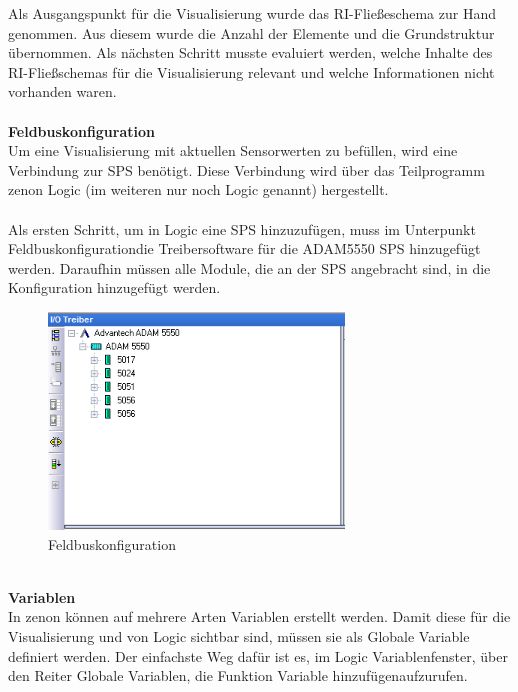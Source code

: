Als Ausgangspunkt für die Visualisierung wurde das RI-Fließeschema zur Hand genommen. Aus diesem wurde die Anzahl der Elemente und die Grundstruktur übernommen. Als nächsten Schritt musste evaluiert werden, welche Inhalte des RI-Fließschemas für die Visualisierung relevant und welche Informationen nicht vorhanden waren.\\
\\
\textbf{Feldbuskonfiguration}\\
Um eine Visualisierung mit aktuellen Sensorwerten zu befüllen, wird eine Verbindung zur SPS benötigt. Diese Verbindung wird über das Teilprogramm zenon Logic (im weiteren nur noch Logic genannt) hergestellt.\\
\\
Als ersten Schritt, um in Logic eine SPS hinzuzufügen, muss im Unterpunkt \glqq Feldbuskonfiguration\grqq\space die Treibersoftware für die ADAM5550 SPS hinzugefügt werden. Daraufhin müssen alle Module, die an der SPS angebracht sind, in die Konfiguration hinzugefügt werden.\\%
\begin{figure}[h!]
  \centering
  \includegraphics[width=0.7\textwidth]{graphics/implementation/Feldbuskonfiguration}
  \caption{Feldbuskonfiguration}%
\end{figure}
\\
\textbf{Variablen}\\
In zenon können auf mehrere Arten Variablen erstellt werden. Damit diese für die Visualisierung und von Logic sichtbar sind, müssen sie als Globale Variable definiert werden. Der einfachste Weg dafür ist es, im Logic Variablenfenster, über den Reiter  \glqq Globale Variablen\grqq, die Funktion \glqq Variable hinzufügen\grqq\space aufzurufen.\\%
